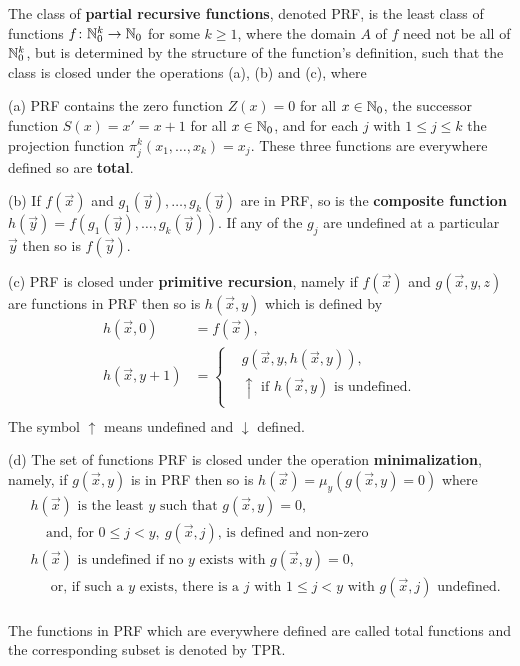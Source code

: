 \documentclass[12pt]{article}
\begin{document}
 The class of {\bf partial recursive functions}, denoted PRF, is the least class of functions $f\colon \mathbb{N}_0^k\rightarrow\mathbb{N}_0$ for some $k\ge 1$, where the domain $A$ of $f$ need not be all of $\mathbb{N}_0^k$, but is determined by the structure of the function's definition, such that the class is closed under the operations (a), (b) and (c), where

(a) PRF contains the zero function $Z(x)=0$ for all $x\in\mathbb{N}_0$, the successor function $S(x)=x'=x+1$ for all $x\in \mathbb{N}_0$, and for each $j$ with $1\le j\le k$ the projection function $\pi_j^k(x_1,\ldots,x_k)=x_j$.
These three functions are everywhere defined so are {\bf total}.
\bigskip

(b) If $f(\vec{x})$ and $g_1(\vec{y}),\ldots,g_k(\vec{y})$ are in PRF, so is the {\bf composite function}
$h(\vec{y})=f(g_1(\vec{y}),\ldots,g_k(\vec{y}))$.
If any of the $g_j$ are undefined at a particular $\vec{y}$ then so is $f(\vec{y})$.
\bigskip

(c) PRF is closed under {\bf primitive recursion}, namely if $f(\vec{x})$ and $g(\vec{x},y,z)$ are functions in PRF then so is $h(\vec{x},y)$ which is defined by
\begin{align*}
h(\vec{x},0)&=f(\vec{x}),\\
h(\vec{x},y+1)&= \begin{cases}
   & g(\vec{x},y,h(\vec{x},y)),\\
&\uparrow \text{ if $h(\vec{x},y)$ is undefined}.\\
 \end{cases}\\
\end{align*}
The symbol $\uparrow$ means undefined and $\downarrow$ defined.
\bigskip


(d) The set of functions PRF is closed under the operation {\bf minimalization}, namely, if $g(\vec{x},y)$ is in PRF then so is $h(\vec{x})=\mu_y(g(\vec{x},y)=0)$ where
\begin{align*}
&h(\vec{x})\text{ is the least $y$ such that $g(\vec{x},y)=0$},\\
&~~~~~\text{and, for $0\le j<y,~ g(\vec{x},j)$, is defined and non-zero}\\
&h(\vec{x}) \text{ is undefined if no $y$ exists with $g(\vec{x},y)=0$},\\
&~~~~~\text{ or, if such a $y$ exists, there is a $j$ with $1\le j<y$ with $g(\vec{x},j)$ undefined}.\\
\end{align*}

The functions in PRF which are everywhere defined are called total functions and the corresponding subset is denoted by TPR.\par
\end{document}
